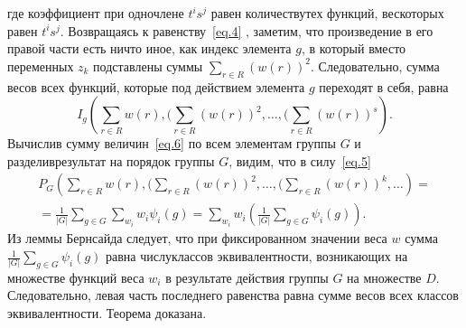 \documentclass[12pt]{article}
\numberwithin{equation}{section} %
\begin{document}
где коэффициент при одночлене $t^i s^j$ равен количествутех функций, вескоторых равен $t^is^j$.
Возвращаясь к равенству~\eqref{eq.4} , заметим, что произведение в его правой части есть ничто иное, как индекс элемента $g$, в который вместо переменных $z_k$ подставлены суммы $\sum_{r \in R}(w(r))^2$. Следовательно, сумма весов всех функций, которые под действием элемента $g$ переходят в себя, равна
\begin{equation}
I_g \left(\sum_{r \in R}w(r),(\sum_{r \in R}(w(r))^2, \dots, (\sum_{r \in R}(w(r))^s \right).
\label{eq.6}
\end{equation}
Вычислив сумму величин~\eqref{eq.6} по всем элементам группы $G$ и разделиврезультат на порядок группы $G$, видим, что в силу~\eqref{eq.5}
\begin{eqnarray}
P_G \left(\sum_{r \in R}w(r),(\sum_{r \in R}(w(r))^2, \dots, (\sum_{r \in R}(w(r))^k, \dots \right)= 
 \nonumber  \\
= \frac{1}{|G|}\sum_{g \in G}\sum_{w_i}w_i \psi_i(g)
= \sum_{w_i}w_i
\left(\frac{1}{|G|}\sum_{g \in G} \psi_i(g) \right).
\nonumber 
\end{eqnarray}
Из леммы Бернсайда следует, что при фиксированном значении веса $w$ сумма $\frac{1}{|G|}\sum_{g \in G} \psi_i(g)$  равна числуклассов эквивалентности, возникающих на
множестве функций веса $w_i$ в результате действия группы $G$ на множестве $D$. Следовательно, левая часть последнего равенства равна сумме весов всех классов эквивалентности. Теорема доказана.
\end{document}
